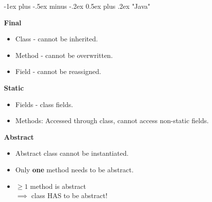 \documentclass[10pt, landscape]{article}
\makeatletter
\renewcommand{\section}{\@startsection{section}{1}{0mm}%
                                {-1ex plus -.5ex minus -.2ex}%
                                {0.5ex plus .2ex}%
                                {\normalfont\large\bfseries}}
\makeatother
\begin{document}
\raggedright
\footnotesize
\begin{multicols}{2}

\setlength{\columnseprule}{0.25pt} %
\setlength{\premulticols}{1pt}
\setlength{\postmulticols}{1pt}
\setlength{\multicolsep}{1pt}
\setlength{\columnsep}{2pt}

\begin{center}
\end{center}

\section{"Java"}
\begin{multicols}{2}

\textbf{Final}
\begin{itemize}
    \item Class - cannot be inherited.
    \item Method - cannot be overwritten.
    \item Field - cannot be reassigned.
\end{itemize}

\textbf{Static}
\begin{itemize}
    \item Fields - class fields.
    \item Methods: Accessed through class, cannot access non-static fields. 
\end{itemize}

\textbf{Abstract}
\begin{itemize}
    \item Abstract class cannot be instantiated.
    \item Only \textbf{one} method needs to be abstract. 
    \item $\geq 1$ method is abstract \\ $\implies$ class HAS to be abstract!
\end{itemize}

\columnbreak{}


\end{multicols}
\end{multicols}
\end{document}

